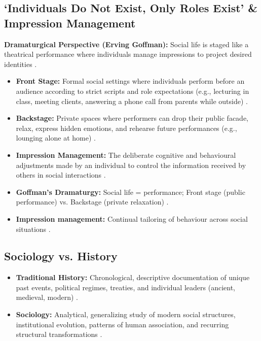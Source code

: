 \subsection{`Individuals Do Not Exist, Only Roles Exist' \& Impression Management}

\begin{KeyConcept}
\textbf{Dramaturgical Perspective (Erving Goffman):}
Social life is staged like a theatrical performance where individuals manage impressions to project desired identities .
\begin{itemize}
    \item \textbf{Front Stage:} Formal social settings where individuals perform before an audience according to strict scripts and role expectations (e.g., lecturing in class, meeting clients, answering a phone call from parents while outside) .
    \item \textbf{Backstage:} Private spaces where performers can drop their public facade, relax, express hidden emotions, and rehearse future performances (e.g., lounging alone at home) .
    \item \textbf{Impression Management:} The deliberate cognitive and behavioural adjustments made by an individual to control the information received by others in social interactions .
\end{itemize}
\end{KeyConcept}

\begin{QuickRevision}
\begin{itemize}
    \item \textbf{Goffman's Dramaturgy:} Social life = performance; Front stage (public performance) vs. Backstage (private relaxation) .
    \item \textbf{Impression management:} Continual tailoring of behaviour across social situations .
\end{itemize}
\end{QuickRevision}

\subsection{Sociology vs. History}

\begin{ComparisonBox}
\begin{itemize}
    \item \textbf{Traditional History:} Chronological, descriptive documentation of unique past events, political regimes, treaties, and individual leaders (ancient, medieval, modern) .
    \item \textbf{Sociology:} Analytical, generalizing study of modern social structures, institutional evolution, patterns of human association, and recurring structural transformations .
\end{itemize}
\end{ComparisonBox}

